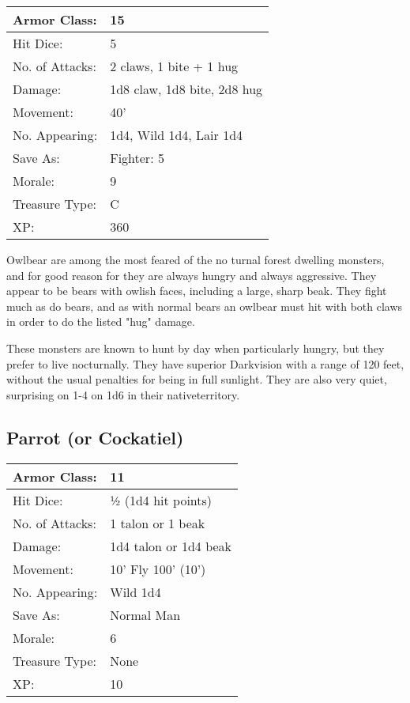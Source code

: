 \documentclass[a4paper,twoside,openany,10pt]{book}
\begin{document}
\begin{multicols}{2}
\begin{tabularx}{0.50\textwidth}{@{}lX@{}}
Armor Class: & 15 \\\hline
Hit Dice: & 5 \\\hline
No. of Attacks: & 2 claws, 1 bite + 1 hug \\\hline
Damage: & 1d8 claw, 1d8 bite, 2d8 hug \\\hline
Movement: & 40' \\\hline
No. Appearing: & 1d4, Wild 1d4, Lair 1d4 \\\hline
Save As: & Fighter: 5 \\\hline
Morale: & 9 \\\hline
Treasure Type: & C \\\hline
XP: & 360 \\\hline
\end{tabularx}\medskip

Owlbear are among the most feared of the no turnal forest dwelling monsters, and for good reason for they are always hungry and always aggressive. They appear to be bears with owlish faces, including a large, sharp beak. They fight much as do bears, and as with normal bears an owlbear must hit with both claws in order to do the listed "hug" damage.

These monsters are known to hunt by day when particularly hungry, but they prefer to live nocturnally. They have superior Darkvision with a range of 120 feet, without the usual penalties for being in full sunlight. They are also very quiet, surprising on 1-4  on 1d6 in their nativeterritory.


\subsection*{Parrot (or Cockatiel)}\label{parrot-or-cockatiel}

\begin{tabularx}{0.50\textwidth}{@{}lX@{}}
Armor Class: & 11 \\\hline
Hit Dice: & ½ (1d4 hit points) \\\hline
No. of Attacks: & 1 talon or 1 beak \\\hline
Damage: & 1d4 talon or 1d4 beak \\\hline
Movement: & 10' Fly 100' (10') \\\hline
No. Appearing: & Wild 1d4 \\\hline
Save As: & Normal Man \\\hline
Morale: & 6 \\\hline
Treasure Type: & None \\\hline
XP: & 10 \\\hline
\end{tabularx}\medskip


\end{multicols}
\end{document}
